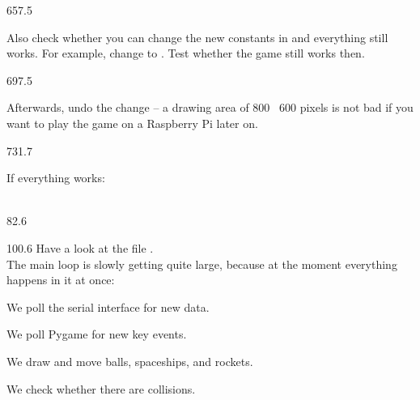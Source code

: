 \documentclass{aslab}
\begin{document}
\begin{region}[pitch=13.4]{657.5}
\begin{tasks}[start=2]
\item Also check whether you can change the new constants in 
  and everything still works. For example, change  to
  . Test whether the game still works then.
\end{tasks}
\end{region}

\begin{region}[pitch=17.5]{697.5}
\begin{tasks}[start=3]
\item Afterwards, undo the change -- a drawing area of 800 \texttimes\ 600
  pixels is not bad if you want to play the game on a Raspberry Pi later
  on. 
\end{tasks}
\end{region}

\begin{region}[pitch=13.4]{731.7}
\begin{tasks}[start=4]
\item If everything works:\\
  \\[-0.2bp]
\end{tasks}
\end{region}

\nextpage
\begin{region}{82.6}
\end{region}

\begin{region}[pitch=13.2]{100.6}
Have a look at the file .\\
The main loop is slowly getting quite large, because at the moment
everything happens in it at once:
\begin{dashlist}
\item We poll the serial interface for new data.
\item We poll Pygame for new key events.
\item We draw and move balls, spaceships, and rockets.
\item We check whether there are collisions.
\end{dashlist}
\end{region}
\end{document}
